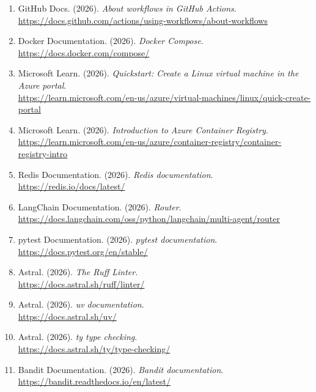 \documentclass[a4paper, 12pt]{article}
\begin{document}
\begin{enumerate}
    \item GitHub Docs. (2026). \textit{About workflows in GitHub Actions}. \\
    \url{https://docs.github.com/actions/using-workflows/about-workflows}

    \item Docker Documentation. (2026). \textit{Docker Compose}. \\
    \url{https://docs.docker.com/compose/}

    \item Microsoft Learn. (2026). \textit{Quickstart: Create a Linux virtual machine in the Azure portal}. \\
    \url{https://learn.microsoft.com/en-us/azure/virtual-machines/linux/quick-create-portal}

    \item Microsoft Learn. (2026). \textit{Introduction to Azure Container Registry}. \\
    \url{https://learn.microsoft.com/en-us/azure/container-registry/container-registry-intro}

    \item Redis Documentation. (2026). \textit{Redis documentation}. \\
    \url{https://redis.io/docs/latest/}

    \item LangChain Documentation. (2026). \textit{Router}. \\
    \url{https://docs.langchain.com/oss/python/langchain/multi-agent/router}

    \item pytest Documentation. (2026). \textit{pytest documentation}. \\
    \url{https://docs.pytest.org/en/stable/}

    \item Astral. (2026). \textit{The Ruff Linter}. \\
    \url{https://docs.astral.sh/ruff/linter/}

    \item Astral. (2026). \textit{uv documentation}. \\
    \url{https://docs.astral.sh/uv/}

    \item Astral. (2026). \textit{ty type checking}. \\
    \url{https://docs.astral.sh/ty/type-checking/}

    \item Bandit Documentation. (2026). \textit{Bandit documentation}. \\
    \url{https://bandit.readthedocs.io/en/latest/}


\end{enumerate}
\end{document}
